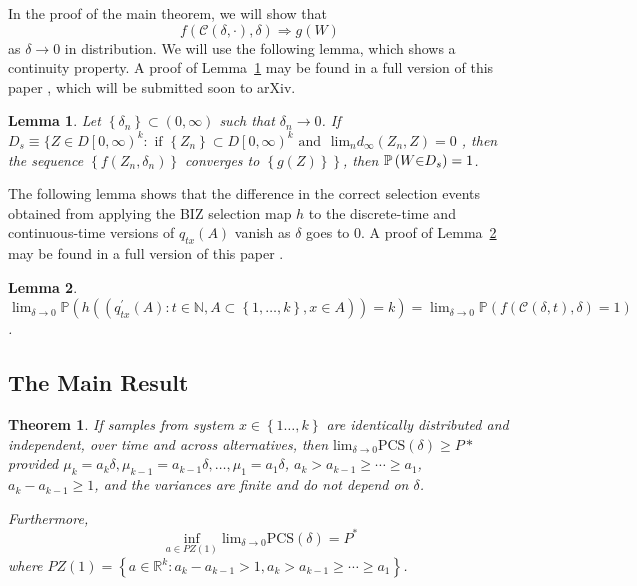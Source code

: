 \documentclass{wscpaperproc}
\theoremstyle{wsc}
\newtheorem{theorem}{Theorem}
\newtheorem{lemma}{Lemma}
\begin{document}
In the proof of the main theorem, we will show that 
\[
f\left(\mathcal{C}\left(\delta,\cdot\right),\delta\right)\Rightarrow g\left(W\right)
\]
as $\delta\rightarrow0$ in distribution. We will use the following lemma, which shows a continuity property.
A proof of Lemma~\ref{l:continuity} may be found in a full version of this paper \cite{fullpaper},
which will be submitted soon to arXiv. 

\begin{lemma}
Let $\left\{ \delta_{n}\right\} \subset\left(0,\infty\right)$ such
that $\delta_{n}\rightarrow0$. If $D_{s}\equiv\{Z\in D\left[0,\infty\right)^{k}:\mbox{ if }\left\{ Z_{n}\right\} \subset D\left[0,\infty\right)^{k}\mbox{ and }$
$\mbox{lim}{}_{n}d_{\infty}\left(Z_{n},Z\right)=0$ , then the sequence
$\left\{ f\left(Z_{n},\delta_{n}\right)\right\} $ converges to $\left\{ g\left(Z\right)\right\} $$\left.\right\} $$ $,
then $ $$\mathbb{P}\left(W\text{\ensuremath{\in}}D_{s}\right)=1$.
\label{l:continuity}
\end{lemma}


The following lemma shows that the difference in the correct selection events obtained from applying the BIZ selection map $h$ to the discrete-time and continuous-time versions of $q_{tx}(A)$ vanish as $\delta$ goes to $0$.
A proof of Lemma~\ref{l:interpolation} may be found in a full version of this paper \cite{fullpaper}.

\begin{lemma}
    $\lim_{\delta\rightarrow0} \mathbb{P}\left( h\left( \left(q_{tx}^{'}\left(A\right):t\in\mathbb{N},A\subset\left\{ 1,\ldots,k\right\} ,x\in A\right) \right) =k\right) = \lim_{\delta\rightarrow0}
 \mathbb{P}\left(
 f\left(\mathcal{C}\left(\delta,t\right),\delta\right)=1
 \right)$.

\label{l:interpolation}
\end{lemma}




\subsection{The Main Result}

\begin{theorem}
\label{t:main}
If samples from system $x\in\left\{ 1\ldots,k\right\} $ are identically
distributed and independent, over time and across alternatives, then
$\mbox{lim}_{\delta\rightarrow0}\mbox{PCS}(\delta) \geq P*$
provided $\mu_{k}=a_{k}\delta,\mu_{k-1}=a_{k-1}\delta,\ldots,\mu_{1}=a_{1}\delta$,
$a_{k}>a_{k-1}\geq \cdots \geq a_{1}$, $a_{k}-a_{k-1}\ge1$, and the variances are finite and
do not depend on $\delta$.

Furthermore,
\[
\inf_{a\in PZ\left(1\right)}\mbox{lim}_{\delta\rightarrow0}\mbox{PCS}(\delta)=P^{*}
\]
where $PZ\left(1\right)=\left\{ a\in\mathbb{R}^{k}:a_{k}-a_{k-1}>1, a_{k}>a_{k-1}\geq \cdots \geq a_{1} \right\} $. 

\end{theorem}
\end{document}
